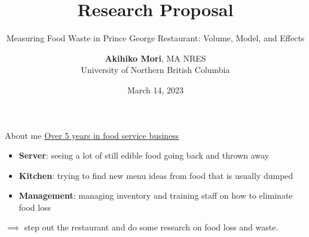 \documentclass{beamer}
\title{Research Proposal}
\subtitle{Measuring Food Waste in Prince George Restaurant: Volume, Model, and Effects}
\author{\textbf{Akihiko Mori}, MA NRES \texorpdfstring{\\University of Northern British Columbia}
\texorpdfstring{\\Supervisor: Dr. Deo Balbinder}{}}
\date{March 14, 2023}
\begin{document}
\begin{frame}
    \maketitle
\end{frame}

\begin{frame}{About me}
  \underline{Over 5 years in food service business}
  \begin{itemize}
    \item \textbf{Server}: seeing a lot of still edible food going back and thrown away\\
    \item \textbf{Kitchen}: trying to find new menu ideas from food that is usually dumped\\
    \item \textbf{Management}: managing inventory and training staff on how to eliminate food loss\\
  \end{itemize}
  $\implies$ step out the restaurant and do some research on food loss and waste.
\end{frame}
\end{document}
